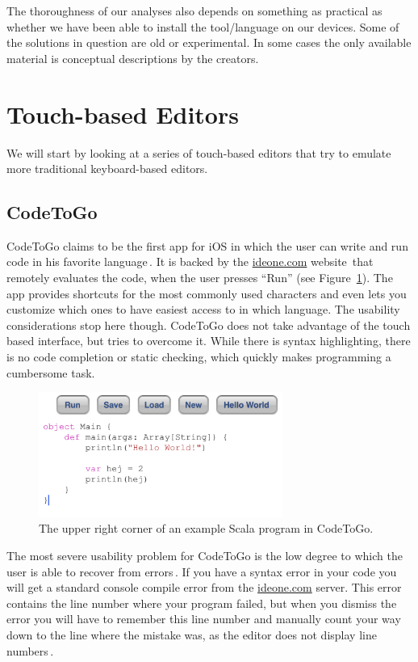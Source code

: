 The thoroughness of our analyses also depends on something as practical as whether we have been able to install the tool/language on our devices.
Some of the solutions in question are old or experimental.
In some cases the only available material is conceptual descriptions by the creators.

\section{Touch-based Editors}
\label{subsec:TouchBasedEditors}
We will start by looking at a series of touch-based editors that try to emulate more traditional keyboard-based editors. 

\subsection{CodeToGo}
\label{subsub:CodeToGo}
CodeToGo claims to be the first app for iOS in which the user can write and run code in his favorite language\,\cite{codetogo}. It is backed by the \url{ideone.com} website\,\cite{ideone} that remotely evaluates the code, when the user presses ``Run'' (see Figure~\ref{fig:CodeToGo_screenshot}). The app provides shortcuts for the most commonly used characters and even lets you customize which ones to have easiest access to in which language. The usability considerations stop here though. CodeToGo does not take advantage of the touch based interface, but tries to overcome it. While there is syntax highlighting, there is no code completion or static checking, which quickly makes programming a cumbersome task.

\begin{figure}
	\centering
		\includegraphics[width=80mm]{diagrams/CodeToGo_screenshot.PNG}
	\caption{The upper right corner of an example Scala program in CodeToGo.}
\label{fig:CodeToGo_screenshot}
\end{figure}

The most severe usability problem for CodeToGo is the low degree to which the user is able to recover from errors\,\cite{nielsen1990heuristic}. 
If you have a syntax error in your code you will get a standard console compile error from the \url{ideone.com} server. 
This error contains the line number where your program failed, but when you dismiss the error you will have to remember this line number and manually count your way down to the line where the mistake was, as the editor does not display line numbers\,\cite{nielsen1990heuristic}.

